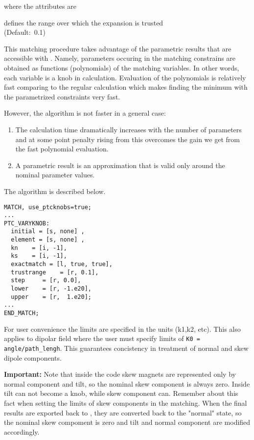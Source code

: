 where the attributes are
\begin{madlist}
   defines the range over which the expansion is
  trusted \\ (Default:~0.1)
\end{madlist}

This matching procedure takes advantage of the parametric results that
are accessible with \ptc. Namely, parameters occuring in the matching
constrains are obtained as functions (polynomials) of the matching
variables. In other words, each variable is a knob in \ptc
calculation. Evaluation of the polynomials is relatively fast comparing
to the regular \ptc calculation which makes finding the minimum with the
parametrized constraints very fast.  

However, the algorithm is not faster in a general case: 
\begin{enumerate}
   \item  The calculation time dramatically increases with the number of
     parameters and at some point penalty rising from this overcomes the
     gain we get from the fast polynomial evaluation.    
   \item  A parametric result is an approximation that is valid only
     around the nominal parameter values.     
\end{enumerate}

The algorithm is described below. \\
 
\begin{verbatim}
MATCH, use_ptcknobs=true;
...
PTC_VARYKNOB: 
  initial = [s, none] , 
  element = [s, none] , 
  kn    = [i, -1], 
  ks    = [i, -1], 
  exactmatch = [l, true, true], 
  trustrange    = [r, 0.1],  
  step     = [r, 0.0], 
  lower    = [r, -1.e20],
  upper    = [r,  1.e20]; 
...
END_MATCH;
\end{verbatim}

For user convenience the limits are specified in the \madx units (k1,k2,
etc). This also applies to dipolar field where the user must specify
limits of {\tt K0 = angle/path\_lengh}. This guarantees concistency in
treatment of normal and skew dipole components.   

{\bf Important:} Note that inside the code skew magnets are represented
only by normal component and tilt, so the nominal skew component is
always zero.  Inside \ptc tilt can not become a knob, while skew
component can.  Remember about this fact when setting the limits of skew
components in the matching.  When the final results are exported back to
\madx, they are converted back to the "normal" state, so the nominal
skew compoment is zero and tilt and normal component are modified
accordingly.



